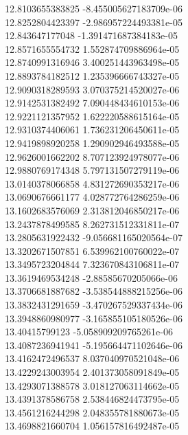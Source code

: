 {12.8103655383825 -8.455005627183709e-06
 \\
12.8252804423397 -2.986957224493381e-05
 \\
12.843647177048 -1.391471687384183e-05
 \\
12.8571655554732 1.552874709886964e-05
 \\
12.8740991316946 3.400251443963498e-05
 \\
12.8893784182512 1.235396666743327e-05
 \\
12.9090318289593 3.070375214520027e-06
 \\
12.9142531382492 7.090448434610153e-06
 \\
12.9221121357952 1.622220588615164e-05
 \\
12.9310374406061 1.736231206450611e-05
 \\
12.9419898920258 1.290902946493588e-05
 \\
12.9626001662202 8.707123924978077e-06
 \\
12.9880769174348 5.797131507279119e-06
 \\
13.0140378066858 4.831272690353217e-06
 \\
13.0690676661177 4.028772764286259e-06
 \\
13.1602683576069 2.313812046850217e-06
 \\
13.2437878499585 8.262731512331811e-07
 \\
13.2805631922432 -9.056681165020564e-07
 \\
13.3202671507851 6.539962100760022e-07
 \\
13.3495723204844 7.323670843106811e-07
 \\
13.3619469534248 -2.88585670205066e-06
 \\
13.3706681887682 -3.538544888215256e-06
 \\
13.3832431291659 -3.470267529337434e-06
 \\
13.3948860980977 -3.165855105180526e-06
 \\
13.40415799123 -5.058909209765261e-06
 \\
13.4087236941941 -5.195664471102646e-06
 \\
13.4162472496537 8.037040970521048e-06
 \\
13.4229243003954 2.401373058091849e-05
 \\
13.4293071388578 3.018127063114662e-05
 \\
13.4391378586758 2.538446824473795e-05
 \\
13.4561216244298 2.048355781880673e-05
 \\
13.4698821660704 1.056157816492487e-05
}
